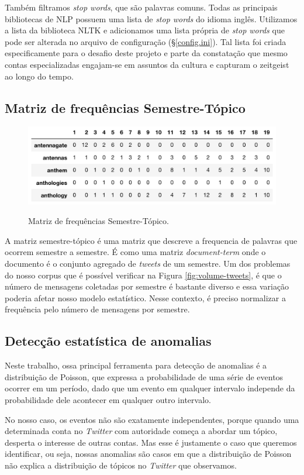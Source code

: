 \documentclass[paper=a4, fontsize=11pt]{scrartcl}
\numberwithin{equation}{section}		%
\numberwithin{figure}{section}			%
\numberwithin{table}{section}				%
\begin{document}
Também filtramos \emph{stop words}, que são palavras comuns. Todas as principais bibliotecas de NLP possuem uma lista de \emph{stop words} do idioma inglês. Utilizamos a lista da biblioteca NLTK \citep{nltk} e adicionamos uma lista própria de \emph{stop words} que pode ser alterada no arquivo de configuração (\S \ref{config.ini}). Tal lista foi criada especificamente para o desafio deste projeto e parte da constatação que mesmo contas especializadas engajam-se em assuntos da cultura e capturam o zeitgeist ao longo do tempo.

\subsection{Matriz de frequências Semestre-Tópico}
\begin{figure}[h]
	\centering
	\caption{Matriz de frequências Semestre-Tópico.}
	\includegraphics[width=.8\columnwidth]{sem-term}
	\label{fig:sem-term}
\end{figure}

A matriz semestre-tópico é uma matriz que descreve a frequencia de palavras que ocorrem semestre a semestre. É como uma matriz \emph{document-term} onde o documento é o conjunto agregado de \emph{tweets} de um semestre. 
Um dos problemas do nosso corpus que é possível verificar na Figura \ref{fig:volume-tweets}, é que o número de mensagens coletadas por semestre é bastante diverso e essa variação poderia afetar nosso modelo estatístico. Nesse contexto, é preciso normalizar a frequência pelo número de mensagens por semestre.
\subsection{Detecção estatística de anomalias}
Neste trabalho, ossa principal ferramenta para detecção de anomalias é a distribuição de Poisson, que expressa a probabilidade de uma série de eventos ocorrer em um período, dado que um evento em qualquer intervalo independe da probabilidade dele acontecer em qualquer outro intervalo.

No nosso caso, os eventos não são exatamente independentes, porque quando uma determinada conta no \emph{Twitter} com autoridade começa a abordar um tópico, desperta o interesse de outras contas. Mas esse é justamente o caso que queremos identificar, ou seja, nossas anomalias são casos em que a distribuição de Poisson não explica a distribuição de tópicos no \emph{Twitter} que observamos.
\end{document}
